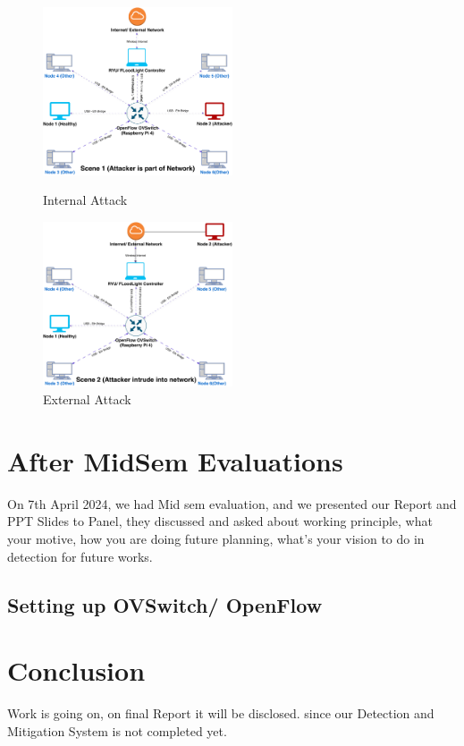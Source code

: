 \documentclass[12pt,twocolumn]{article}
\begin{document}
\begin{figure}[ht]
    \includegraphics[width=0.5\textwidth]{images/Scene1.pdf}
    \caption{Internal Attack}
    \label{fig:Scene1}
\vspace*{0.5 cm}
    \includegraphics[width=0.5\textwidth]{images/Scene2.pdf}
    \caption{External Attack}
    \label{fig:scene2}
\end{figure}


\section{After MidSem Evaluations}
On 7th April 2024, we had Mid sem evaluation, and we presented our Report and PPT Slides to Panel, they discussed and asked about working principle, what your motive, how you are doing future planning, what's your vision to do in detection for future works.

\subsection{Setting up OVSwitch/ OpenFlow}



\section{Conclusion}
Work is going on, on final Report it will be disclosed.
since our Detection and Mitigation System is not completed yet.




\twocolumn[
    \printbibliography
]
\end{document}

